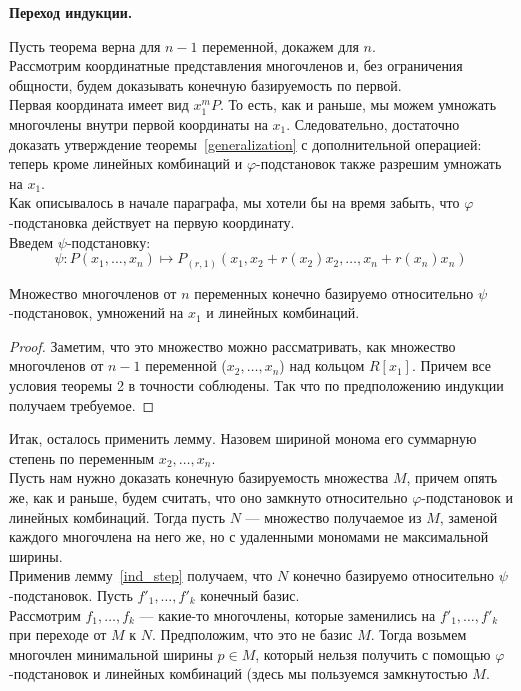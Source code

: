\vskip 0.1in\noindent
{\large\textbf{Переход индукции.}}

Пусть теорема верна для $n-1$ переменной, докажем для $n$.\\
Рассмотрим координатные представления многочленов и, без ограничения общности, будем доказывать конечную базируемость по первой.\\
Первая координата имеет вид $x_1^m P$.
То есть, как и раньше, мы можем умножать многочлены внутри первой координаты на $x_1$.
Следовательно, достаточно доказать утверждение теоремы~\ref{generalization} с дополнительной операцией: теперь кроме линейных комбинаций и $\varphi$-подстановок также разрешим умножать на $x_1$.\\
Как описывалось в начале параграфа, мы хотели бы на время забыть, что $\varphi$-подстановка действует на первую координату. \\Введем $\psi$-подстановку:
\[\psi : P(x_1,\ldots,x_n) \mapsto P_{(r,1)}(x_1,x_2+r(x_2)x_2,\ldots,x_n+r(x_n)x_n)\]\vskip 0.1in\noindent
\begin{lemma}
    \label{ind_step}
    Множество многочленов от $n$ переменных конечно базируемо относительно $\psi$-подстановок, умножений на $x_1$ и линейных комбинаций.
\end{lemma}
\begin{proof}
    Заметим, что это множество можно рассматривать, как множество многочленов от $n-1$ переменной ($x_2,\ldots,x_n$) над кольцом $R[x_1]$.
    Причем все условия теоремы 2 в точности соблюдены.
    Так что по предположению индукции получаем требуемое.
\end{proof}
Итак, осталось применить лемму.
Назовем шириной монома его суммарную степень по переменным $x_2,\ldots,x_n$.\\
Пусть нам нужно доказать конечную базируемость множества $M$, причем опять же, как и раньше, будем считать, что оно замкнуто относительно $\varphi$-подстановок и линейных комбинаций.
Тогда пусть $N$ --- множество получаемое из $M$, заменой каждого многочлена на него же, но с удаленными мономами не максимальной ширины.\\
Применив лемму~\ref{ind_step} получаем, что $N$ конечно базируемо относительно $\psi$-подстановок.
Пусть $f'_1,\ldots,f'_k$ конечный базис.\\
Рассмотрим $f_1,\ldots,f_k$ --- какие-то многочлены, которые заменились на $f'_1,\ldots,f'_k$ при переходе от $M$ к $N$.
Предположим, что это не базис $M$.
Тогда возьмем многочлен минимальной ширины $p\in M$, который нельзя получить с помощью $\varphi$-подстановок и линейных комбинаций (здесь мы пользуемся замкнутостью $M$.
